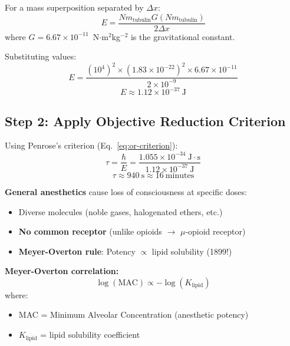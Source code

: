 For a mass superposition separated by $\Delta x$:
\begin{equation}
E = \frac{N m_{\text{tubulin}} G (N m_{\text{tubulin}})}{2\Delta x}
\end{equation}
where $G = 6.67 \times 10^{-11}$~N$\cdot$m$^2$kg$^{-2}$ is the gravitational constant.

Substituting values:
\begin{equation}
E = \frac{(10^4)^2 \times (1.83 \times 10^{-22})^2 \times 6.67 \times 10^{-11}}{2 \times 10^{-9}}
\end{equation}
\begin{equation}
E \approx 1.12 \times 10^{-37}~\text{J}
\end{equation}

\subsection*{Step 2: Apply Objective Reduction Criterion}

Using Penrose's criterion (Eq.~\ref{eq:or-criterion}):
\begin{equation}
\tau = \frac{\hbar}{E} = \frac{1.055 \times 10^{-34}~\text{J}\cdot\text{s}}{1.12 \times 10^{-37}~\text{J}}
\end{equation}
\begin{equation}
\tau \approx 940~\text{s} \approx 16~\text{minutes}
\end{equation}

\textbf{General anesthetics} cause loss of consciousness at specific doses:
\begin{itemize}
\item Diverse molecules (noble gases, halogenated ethers, etc.)
\item \textbf{No common receptor} (unlike opioids $\rightarrow$ $\mu$-opioid receptor)
\item \textbf{Meyer-Overton rule}: Potency $\propto$ lipid solubility (1899!)
\end{itemize}

\textbf{Meyer-Overton correlation:}
\begin{equation}
\label{eq:meyer-overton}
\log(\text{MAC}) \propto -\log(K_{\text{lipid}})
\end{equation}
where:
\begin{itemize}
\item MAC = Minimum Alveolar Concentration (anesthetic potency)
\item $K_{\text{lipid}}$ = lipid solubility coefficient
\end{itemize}

